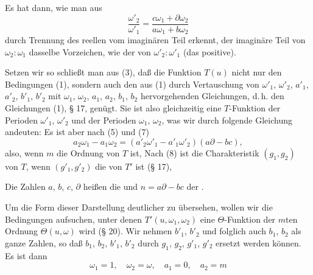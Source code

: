Es hat dann, wie man aus
\[
\frac{\omega'_2}{\omega'_1} = \frac{c\omega_1+\partial\omega_2}{a\omega_1+b\omega_2}
\]
durch Trennung des reellen vom imaginären Teil erkennt, der
imaginäre Teil von $\omega_2:\omega_1$ dasselbe Vorzeichen, wie der von
$\omega'_2:\omega'_1$ (das positive).

Setzen wir
so schließt man aus (3), daß die Funktion $T(u)$ nicht nur den
Bedingungen (1), sondern auch den aus (1) durch Vertauschung
von $\omega'_1$, $\omega'_2$, $a'_1$, $a'_2$, $b'_1$, $b'_2$ mit $\omega_1$, $\omega_2$, $a_1$, $a_2$, $b_1$, $b_2$ hervorgehenden
Gleichungen, d.\,h. den Gleichungen (1), § 17, genügt. Sie ist
also gleichzeitig eine $T$-Funktion der Perioden $\omega'_1$, $\omega'_2$ und der
Perioden $\omega_1$, $\omega_2$, was wir durch folgende Gleichung andeuten:
Es ist aber nach (5) und (7)
\[
a_2\omega_1 - a_1\omega_2 = (a'_2\omega'_1 - a'_1\omega'_2)(a\partial - bc),
\]
also, wenn $m$ die Ordnung von $T$ ist,
Nach (8) ist die Charakteristik $(g_1, g_2)$ von $T$, wenn $(g'_1, g'_2)$
die von $T'$ ist (§ 17),

Die Zahlen $a$, $b$, $c$, $\partial$ heißen die 
und $n = a\partial - bc$ der .

Um die Form dieser Darstellung deutlicher zu übersehen,
wollen wir die Bedingungen aufsuchen, unter denen $T'(u, \omega_1, \omega_2)$
eine $\Theta$-Funktion der $m$ten Ordnung $\Theta(u,\omega)$ wird (§ 20). Wir
nehmen $b'_1$, $b'_2$ und folglich auch $b_1$, $b_2$ als ganze Zahlen, so daß
$b_1$, $b_2$, $b'_1$, $b'_2$ durch $g_1$, $g_2$, $g'_1$, $g'_2$ ersetzt werden können. Es
ist dann
\[
\omega_1 = 1, \quad \omega_2 = \omega, \quad a_1 = 0, \quad a_2 = m
\]

